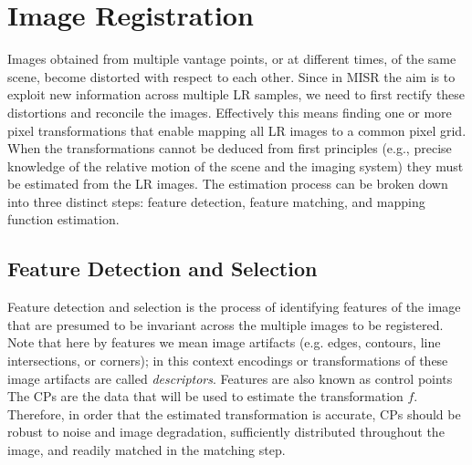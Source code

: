 \section{Image Registration}\label{sec:registration}
\localtableofcontents

Images obtained from multiple vantage points, or at different times, of the same scene, become distorted with respect to each other.
%
Since in MISR the aim is to exploit new information across multiple LR samples, we need to first rectify these distortions and reconcile the images.
%
Effectively this means finding one or more pixel transformations that enable mapping all LR images to a common pixel grid.
%
When the transformations cannot be deduced from first principles (e.g., precise knowledge of the relative motion of the scene and the imaging system) they must be estimated from the LR images.
%
The estimation process can be broken down into three distinct steps: feature detection, feature matching, and mapping function estimation.

\subsection{Feature Detection and Selection}\label{sec:featdetec}

Feature detection and selection is the process of identifying features of the image that are presumed to be invariant across the multiple images to be registered.
%
Note that here by features  we mean image artifacts (e.g. edges, contours, line intersections, or corners); in this context encodings or transformations of these image artifacts are called \textit{descriptors}.
%
Features are also known as control points 
%
The CPs are the data that will be used to estimate the transformation \(f\).
%
Therefore, in order that the estimated transformation is accurate, CPs should be robust to noise and image degradation, sufficiently distributed throughout the image, and readily matched in the matching step.

